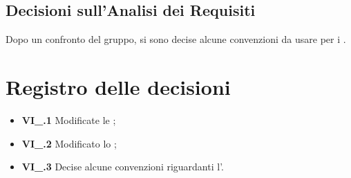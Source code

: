 \subsection{Decisioni sull'Analisi dei Requisiti}
Dopo un confronto del gruppo, si sono decise alcune convenzioni da usare per i .

\section{Registro delle decisioni}
\begin{itemize}
  \item \textbf{VI\_\Data.1} Modificate le \NdP;
  \item \textbf{VI\_\Data.2} Modificato lo \SdF;
  \item \textbf{VI\_\Data.3} Decise alcune convenzioni riguardanti l'\AdR.
\end{itemize}